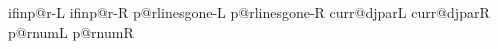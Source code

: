 \def\SSsetLRspecific{\ifx\ds@ffix\empty\def\sfx{\@orig}\else\edef\sfx{\ds@ffix}\fi
  \let\wh@t\sp@cificSideDef\pr@cessSpecific}%

\def\showLRspecific{\edef\sfx{\ifdiglot \c@rrdstat\else \@rig\fi}%
  \let\wh@t\sh@wSpecificDef\pr@cessSpecificDef
  \let\wh@t\sh@wSpecificDim\pr@cessSpecificDim
  \let\wh@t\sh@wSpecificDim\pr@cessSpecificCount %
}%
\def\saveLRspecificSide#1{\edef\sfx{#1}%
  \ifx\sfx\empty\let\sfx\@rig\fi
  \trace{S}{Redefining #1-specific values to current settings}%
  \let\wh@t\s@veSpecificSideDef\pr@cessSpecificDef
  \ifx\sfx\l@stLRspecific\else %
    \let\wh@t\s@veSpecificSideDim\pr@cessSpecificDim
  \fi
}
%
%
\def\saveLRspecificOrig{%
  \trace{d}{saveLRspecificOrig \c@rrdstat}%
  \let\wh@t\s@veSpecificOrig\pr@cessSpecificAll\let\saveLRspecificOrig=\relax}

\def\restoreLRorig{%
  \trace{d}{restoreLRorig}%
  \let\wh@t\restoreLR@rig\pr@cessSpecificDim
  \let\wh@t\restoreLR@rig\pr@cessSpecificCount
}
  

\newdimen\FontSizeUnitL\FontSizeUnitL=-1sp\newdimen\FontSizeUnitR\FontSizeUnitR=-1sp
\newdimen\le@dingunitL\le@dingunitL=-1sp\newdimen\le@dingunitR\le@dingunitR=-1sp
\newdimen\onel@neunitL\onel@neunitL=-1sp\newdimen\onel@neunitR\onel@neunitR=-1sp
\newdimen\verticalsp@ceunitL\verticalsp@ceunitL=-1sp\newdimen\verticalsp@ceunitR\verticalsp@ceunitR=-1sp
\newdimen\IndentUnitL\IndentUnitL=-1sp\newdimen\IndentUnitR\IndentUnitR=-1sp
\def\SpaceStretchFactorL{}\def\SpaceStretchFactorR{}
\def\SpaceShrinkFactorL{}\def\SpaceShrinkFactorR{}
\newif\ifRTLL \newif\ifRTLR
\x@\newif\csname ifinp@r-L\endcsname %
\x@\newif\csname ifinp@r-R\endcsname %
\x@\newcount\csname p@rlinesgone-L\endcsname %
\x@\newcount\csname p@rlinesgone-R\endcsname %
\x@\newcount\csname curr@djparL\endcsname %
\x@\newcount\csname curr@djparR\endcsname %
\x@\newcount\csname p@rnumL\endcsname %
\x@\newcount\csname p@rnumR\endcsname %

